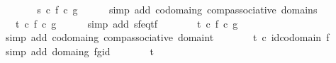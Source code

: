 \begin{isabellebody}
\ \ \isamarkupfalse%
\ \isamarkupfalse%
\ {\isachardoublequoteopen}{\isachardot}{\kern0pt}{\isachardot}{\kern0pt}{\isachardot}{\kern0pt}\ {\isacharequal}{\kern0pt}\ {\isacharparenleft}{\kern0pt}s\ {\isasymcirc}\isactrlsub c\ f{\isacharparenright}{\kern0pt}\ {\isasymcirc}\isactrlsub c\ g{\isachardoublequoteclose}\isanewline
\ \ \ \ \isamarkupfalse%
\ {\isacharparenleft}{\kern0pt}simp\ add{\isacharcolon}{\kern0pt}\ codomain{\isacharunderscore}{\kern0pt}g\ comp{\isacharunderscore}{\kern0pt}associative\ domain{\isacharunderscore}{\kern0pt}s{\isacharparenright}{\kern0pt}\isanewline
\ \ \isamarkupfalse%
\ \isamarkupfalse%
\ {\isachardoublequoteopen}{\isachardot}{\kern0pt}{\isachardot}{\kern0pt}{\isachardot}{\kern0pt}\ {\isacharequal}{\kern0pt}\ {\isacharparenleft}{\kern0pt}t\ {\isasymcirc}\isactrlsub c\ f{\isacharparenright}{\kern0pt}\ {\isasymcirc}\isactrlsub c\ g{\isachardoublequoteclose}\isanewline
\ \ \ \ \isamarkupfalse%
\ {\isacharparenleft}{\kern0pt}simp\ add{\isacharcolon}{\kern0pt}\ sf{\isacharunderscore}{\kern0pt}eq{\isacharunderscore}{\kern0pt}tf{\isacharparenright}{\kern0pt}\isanewline
\ \ \isamarkupfalse%
\ \isamarkupfalse%
\ {\isachardoublequoteopen}{\isachardot}{\kern0pt}{\isachardot}{\kern0pt}{\isachardot}{\kern0pt}\ {\isacharequal}{\kern0pt}\ t\ {\isasymcirc}\isactrlsub c\ {\isacharparenleft}{\kern0pt}f\ {\isasymcirc}\isactrlsub c\ g{\isacharparenright}{\kern0pt}{\isachardoublequoteclose}\isanewline
\ \ \ \ \isamarkupfalse%
\ {\isacharparenleft}{\kern0pt}simp\ add{\isacharcolon}{\kern0pt}\ codomain{\isacharunderscore}{\kern0pt}g\ comp{\isacharunderscore}{\kern0pt}associative\ domain{\isacharunderscore}{\kern0pt}t{\isacharparenright}{\kern0pt}\isanewline
\ \ \isamarkupfalse%
\ \isamarkupfalse%
\ {\isachardoublequoteopen}{\isachardot}{\kern0pt}{\isachardot}{\kern0pt}{\isachardot}{\kern0pt}\ {\isacharequal}{\kern0pt}\ t\ {\isasymcirc}\isactrlsub c\ id{\isacharparenleft}{\kern0pt}codomain\ f{\isacharparenright}{\kern0pt}{\isachardoublequoteclose}\isanewline
\ \ \ \ \isamarkupfalse%
\ {\isacharparenleft}{\kern0pt}simp\ add{\isacharcolon}{\kern0pt}\ domain{\isacharunderscore}{\kern0pt}g\ fg{\isacharunderscore}{\kern0pt}id{\isacharparenright}{\kern0pt}\isanewline
\ \ \isamarkupfalse%
\ \isamarkupfalse%
\ {\isachardoublequoteopen}{\isachardot}{\kern0pt}{\isachardot}{\kern0pt}{\isachardot}{\kern0pt}\ {\isacharequal}{\kern0pt}\ t{\isachardoublequoteclose}\isanewline

\end{isabellebody}
